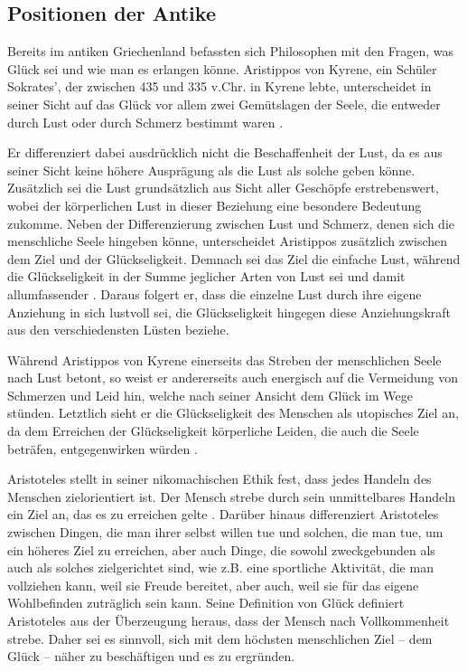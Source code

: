 \subsection{Positionen der Antike}

Bereits im antiken Griechenland befassten sich Philosophen mit den Fragen, was Glück sei und wie man es erlangen könne. 
Aristippos von Kyrene, ein Schüler Sokrates', der zwischen 435 und 335 v.Chr. in Kyrene lebte, unterscheidet in seiner Sicht auf das Glück vor allem zwei Gemütslagen der Seele, die entweder durch Lust oder durch Schmerz bestimmt waren \cite[S.\,116]{DL67}.

Er differenziert dabei ausdrücklich nicht die Beschaffenheit der Lust, da es aus seiner Sicht keine höhere Ausprägung als die Lust als solche geben könne. 
Zusätzlich sei die Lust grundsätzlich aus Sicht aller Geschöpfe erstrebenswert, wobei der körperlichen Lust in dieser Beziehung eine besondere Bedeutung zukomme. 
Neben der Differenzierung zwischen Lust und Schmerz, denen sich die menschliche Seele hingeben könne, unterscheidet Aristippos zusätzlich zwischen dem Ziel und der Glückseligkeit. 
Demnach sei das Ziel die einfache Lust, während die Glückseligkeit in der Summe jeglicher Arten von Lust sei und damit allumfassender \cite[S.\,116]{DL67}.
Daraus folgert er, dass die einzelne Lust durch ihre eigene Anziehung in sich lustvoll sei, die Glückseligkeit hingegen diese Anziehungskraft aus den verschiedensten Lüsten beziehe. 

Während Aristippos von Kyrene einerseits das Streben der menschlichen Seele nach Lust betont, so weist er andererseits auch energisch auf die Vermeidung von Schmerzen und Leid hin, welche nach seiner Ansicht dem Glück im Wege stünden. 
Letztlich sieht er die Glückseligkeit des Menschen als utopisches Ziel an, da dem Erreichen der Glückseligkeit körperliche Leiden, die auch die Seele beträfen, entgegenwirken würden \cite[S.\,119]{DL67}.

Aristoteles stellt in seiner nikomachischen Ethik fest, dass jedes Handeln des Menschen zielorientiert ist. 
Der Mensch strebe durch sein unmittelbares Handeln ein Ziel an, das es zu erreichen gelte \cite[S.\,4]{MF93}.
Darüber hinaus differenziert Aristoteles zwischen Dingen, die man ihrer selbst willen tue und solchen, die man tue, um ein höheres Ziel zu erreichen, aber auch Dinge, die sowohl zweckgebunden als auch als solches zielgerichtet sind, wie z.B. eine sportliche Aktivität, die man vollziehen kann, weil sie Freude bereitet, aber auch, weil sie für das eigene Wohlbefinden zuträglich sein kann. 
Seine Definition von Glück definiert Aristoteles aus der Überzeugung heraus, dass der Mensch nach Vollkommenheit strebe. 
Daher sei es sinnvoll, sich mit dem höchsten menschlichen Ziel -- dem Glück -- näher zu beschäftigen und es zu ergründen. 

